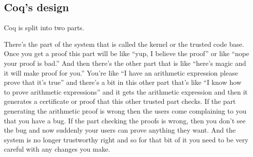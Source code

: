 \begin{subappendices}
\begin{comment}
In cock here is this palette of performance issues and like what they look like okay, so that seemed like a good introduction sketch. That level of abstraction you have my. Cult thanks sure. I'm assuming that you don't want to have any input into this strategy.


\section{Transcript bits from Talking with Rajee}
High level story:

Coq and proof assistance are important. Performance in them is important, especially at scale. Performance engineering in proof assistants has some unique challenges that don't show up in other programming languages.

And I want to paint a picture of what the unique challenges are.  There are two main areas in the existing system that I want to call attention to, in regards to performance bottlenecks.  I will describe them, and describe the performance issues, and propose some reasons about why there might be performance bottlenecks, and describe solutions for them. And maybe also there'll be another section that has some miscellaneous other performance bottlenecks.
\end{comment}

\section{Coq's design}
Coq is split into two parts.

There's the part of the system that is called the kernel or the trusted code base.
Once you get a proof this part will be like ``yup, I believe the proof'' or like ``nope your proof is bad.''
And then there's the other part that is like ``here's magic and it will make proof for you.''
You're like ``I have an arithmetic expression please prove that it's true'' and there's a bit in this other part that's like ``I know how to prove arithmetic expressions'' and it gets the arithmetic expression and then it generates a certificate or proof that this other trusted part checks.
If the part generating the arithmetic proof is wrong then the users come complaining to you that you have a bug.
If the part checking the proofs is wrong, then you don't see the bug and now suddenly your users can prove anything they want.
And the system is no longer trustworthy right and so for that bit of it you need to be very careful with any changes you make.
\end{subappendices}
